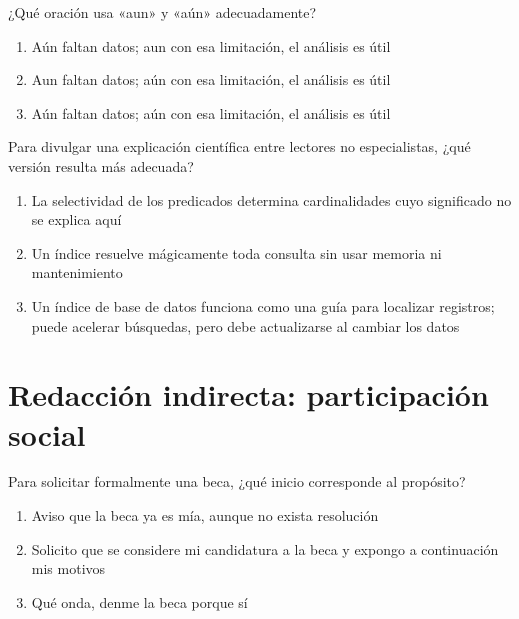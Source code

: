 \noindent\begin{minipage}{\linewidth}\setlength{\parskip}{4pt}\label{q:E-014}
¿Qué oración usa «aun» y «aún» adecuadamente?
\begin{enumerate}[label=\Alph*),nosep]
\item Aún faltan datos; aun con esa limitación, el análisis es útil
\item Aun faltan datos; aún con esa limitación, el análisis es útil
\item Aún faltan datos; aún con esa limitación, el análisis es útil
\end{enumerate}\end{minipage}\par\medskip

\noindent\begin{minipage}{\linewidth}\setlength{\parskip}{4pt}\label{q:E-015}
Para divulgar una explicación científica entre lectores no especialistas, ¿qué versión resulta más adecuada?
\begin{enumerate}[label=\Alph*),nosep]
\item La selectividad de los predicados determina cardinalidades cuyo significado no se explica aquí
\item Un índice resuelve mágicamente toda consulta sin usar memoria ni mantenimiento
\item Un índice de base de datos funciona como una guía para localizar registros; puede acelerar búsquedas, pero debe actualizarse al cambiar los datos
\end{enumerate}\end{minipage}\par\medskip

\section{Redacción indirecta: participación social}

\noindent\begin{minipage}{\linewidth}\setlength{\parskip}{4pt}\label{q:E-016}
Para solicitar formalmente una beca, ¿qué inicio corresponde al propósito?
\begin{enumerate}[label=\Alph*),nosep]
\item Aviso que la beca ya es mía, aunque no exista resolución
\item Solicito que se considere mi candidatura a la beca y expongo a continuación mis motivos
\item Qué onda, denme la beca porque sí
\end{enumerate}\end{minipage}\par\medskip

